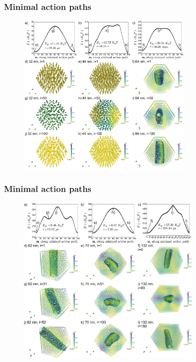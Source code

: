 \documentclass{beamer}
\begin{document}
                \begin{frame}
                  \frametitle{Minimal action paths}
                  \begin{figure}[htb]
                    \centering
                    \includegraphics[width=0.76\textwidth]{Chapter_01_Figure_07.pdf}
                  \end{figure}
                \end{frame}


                \begin{frame}
                  \frametitle{Minimal action paths}
                  \begin{figure}[htb]
                    \centering
                    \includegraphics[width=0.8\textwidth]{Chapter_01_Figure_08.pdf}
                  \end{figure}
                \end{frame}
\end{document}
